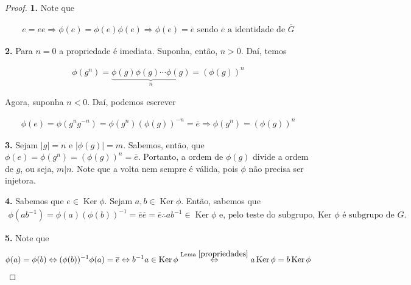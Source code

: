 \documentclass[a4paper,portuguese,11pt,twoside, leqno]{book}
\DeclareMathOperator{\Ker}{Ker}
\theoremstyle{definition}
\begin{document}
	\begin{proof}
		\textbf{1.} Note que 
		
		\begin{align*}
		e = ee \Rightarrow \phi(e) = \phi(e)\phi(e) \Rightarrow \phi(e) = \overline{e}\text{ sendo $\overline{e}$ a identidade de $\overline{G}$}
		\end{align*}
		
		\par\vspace{0.3cm}\hspace{17pt}\textbf{2.} Para $n = 0$ a propriedade é imediata. Suponha, então, $n>0$. Daí, temos
		
		\begin{align*}
		\phi(g^n) = \underbrace{\phi(g)\phi(g)\cdots\phi(g)}_{n} = (\phi(g))^n
		\end{align*} 
		
		\par\vspace{0.3cm} Agora, suponha $n<0$. Daí, podemos escrever
		
		\begin{align*}
		\phi(e) = \phi(g^ng^{-n}) = \phi(g^n)(\phi(g))^{-n} = \overline{e} \Rightarrow \phi(g^n) = (\phi(g))^n
		\end{align*}
		
		\par\vspace{0.3cm}\hspace{17pt}\textbf{3.} Sejam $|g| = n$ e $|\phi(g)| = m$. Sabemos, então, que $\phi(e) = \phi(g^n) = (\phi(g))^n = \overline{e}$. Portanto, a ordem de $\phi(g)$ divide a ordem de $g$, ou seja, $m|n$. Note que a volta nem sempre é válida, pois $\phi$ não precisa ser injetora.
		
		\par\vspace{0.3cm}\hspace{17pt}\textbf{4.} Sabemos que $e\in \Ker\phi$. Sejam $a,b\in \Ker\phi$. Então, sabemos que 
		\begin{align*}
		\phi(ab^{-1}) = \phi(a)(\phi(b))^{-1} = \overline{e}\overline{e} = \overline{e} \therefore ab^{-1}\in\Ker\phi\text{ e, pelo teste do subgrupo, Ker $\phi$ é subgrupo de $G$.}
		\end{align*}
		
		\par\vspace{0.3cm}\hspace{17pt}\textbf{5.} Note que 
		\begin{align*}
		\phi(a) = \phi(b) \Leftrightarrow (\phi(b))^{-1}\phi(a) = \overline{e} \Leftrightarrow b^{-1}a\in \Ker\phi \overset{\text{Lema }\eqref{propriedades}}{\Leftrightarrow} a\Ker\phi = b\Ker\phi
		\end{align*}
		

\end{proof}
\end{document}

